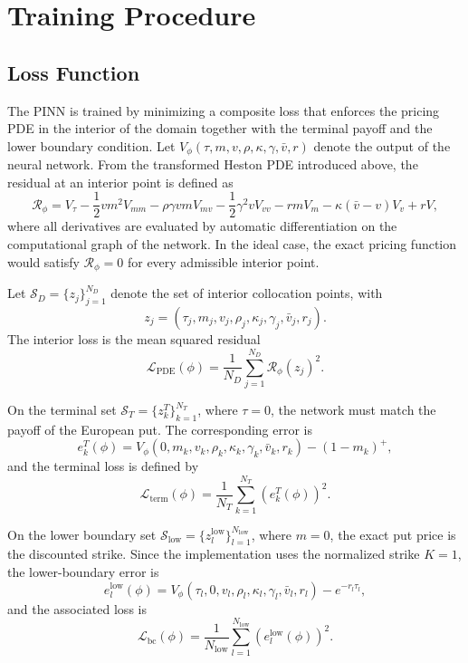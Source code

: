 \section{Training Procedure}

\subsection{Loss Function}

The PINN is trained by minimizing a composite loss that enforces the pricing PDE in the interior of the domain together with the terminal payoff and the lower boundary condition. Let $V_\phi(\tau,m,v,\rho,\kappa,\gamma,\bar v,r)$ denote the output of the neural network. From the transformed Heston PDE introduced above, the residual at an interior point is defined as
\begin{equation}
\mathcal{R}_\phi =
V_{\tau}
-\frac{1}{2}vm^2V_{mm}
-\rho\gamma vm V_{mv}
-\frac{1}{2}\gamma^2 v V_{vv}
-rm V_m
-\kappa(\bar v-v)V_v
+rV,
\end{equation}
where all derivatives are evaluated by automatic differentiation on the computational graph of the network. In the ideal case, the exact pricing function would satisfy $\mathcal{R}_\phi=0$ for every admissible interior point.

Let $\mathcal{S}_D=\{z_j\}_{j=1}^{N_D}$ denote the set of interior collocation points, with
\[
z_j=(\tau_j,m_j,v_j,\rho_j,\kappa_j,\gamma_j,\bar v_j,r_j).
\]
The interior loss is the mean squared residual
\begin{equation}
\mathcal{L}_{\mathrm{PDE}}(\phi)=
\frac{1}{N_D}\sum_{j=1}^{N_D}\mathcal{R}_\phi(z_j)^2.
\end{equation}

On the terminal set $\mathcal{S}_T=\{z_k^T\}_{k=1}^{N_T}$, where $\tau=0$, the network must match the payoff of the European put. The corresponding error is
\begin{equation}
e_k^{T}(\phi)=V_\phi(0,m_k,v_k,\rho_k,\kappa_k,\gamma_k,\bar v_k,r_k)-(1-m_k)^+,
\end{equation}
and the terminal loss is defined by
\begin{equation}
\mathcal{L}_{\mathrm{term}}(\phi)=
\frac{1}{N_T}\sum_{k=1}^{N_T}\left(e_k^{T}(\phi)\right)^2.
\end{equation}

On the lower boundary set $\mathcal{S}_{\mathrm{low}}=\{z_l^{\mathrm{low}}\}_{l=1}^{N_{\mathrm{low}}}$, where $m=0$, the exact put price is the discounted strike. Since the implementation uses the normalized strike $K=1$, the lower-boundary error is
\begin{equation}
e_l^{\mathrm{low}}(\phi)=
V_\phi(\tau_l,0,v_l,\rho_l,\kappa_l,\gamma_l,\bar v_l,r_l)-e^{-r_l\tau_l},
\end{equation}
and the associated loss is
\begin{equation}
\mathcal{L}_{\mathrm{bc}}(\phi)=
\frac{1}{N_{\mathrm{low}}}\sum_{l=1}^{N_{\mathrm{low}}}\left(e_l^{\mathrm{low}}(\phi)\right)^2.
\end{equation}

